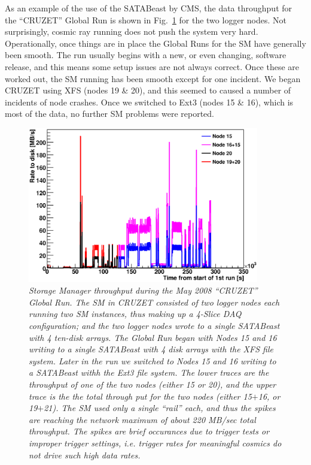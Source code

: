 As an example of the use of the SATABeast by CMS,
the data throughput for the ``CRUZET'' Global Run is shown in Fig.~\ref{fig:cruzet}
for the two logger nodes.
Not surprisingly, cosmic ray running does not push the system very hard.
Operationally, once things are in place the Global Runs for the SM have
generally been smooth.
The run usually begins with a new, or even changing, software release,
and this means some setup issues are not always correct.
Once these are worked out, the SM running has been smooth except for one incident.
We began CRUZET using XFS (nodes 19 \& 20), and this seemed to caused a number
of incidents of node crashes.
Once we switched to Ext3 (nodes 15 \& 16), which is most of the data, 
no further SM problems were reported.

\begin{figure}[t]
\begin{center}  
\includegraphics[width=0.9\textwidth]{Hardware/cruzetByNode}
\caption{\emph{Storage Manager throughput during the May 2008 ``CRUZET'' Global Run. 
The SM in CRUZET consisted of two logger nodes each running two SM instances,
thus making up a 4-Slice DAQ configuration; and the two logger nodes wrote
to a single SATABeast with 4 ten-disk arrays.
 The Global Run began with Nodes 15 and 16
writing to a single SATABeast with 4 disk arrays with the XFS file system.
Later in the run we switched to Nodes 15 and 16 writing to a SATABeast withh the Ext3
file system.
The lower traces are the throughput of one of the two nodes
(either 15 or 20), and the upper trace is the the total through put for
the two nodes (either 15$+$16, or 19$+$21). 
The SM used only a single ``rail'' each, and thus the spikes are reaching the network 
maximum of about 220 MB/sec total throughput. The spikes are brief occurances
due to trigger tests or improper trigger settings, 
i.e.  trigger rates for meaningful cosmics do not drive such high data rates.}}
\label{fig:cruzet}
\end{center}
\end{figure}  

